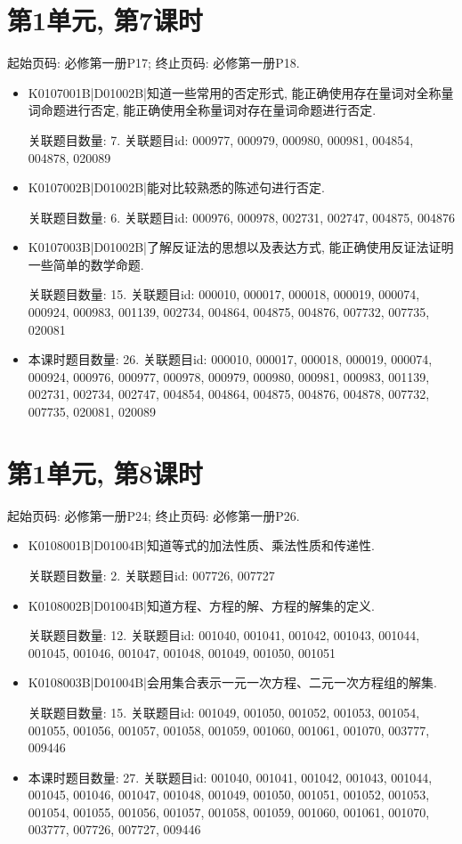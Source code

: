 \section*{第1单元, 第7课时}
起始页码: 必修第一册P17; 终止页码: 必修第一册P18.
\begin{itemize}
\item K0107001B|D01002B|知道一些常用的否定形式, 能正确使用存在量词对全称量词命题进行否定, 能正确使用全称量词对存在量词命题进行否定.

关联题目数量: 7. 关联题目id: 000977, 000979, 000980, 000981, 004854, 004878, 020089

\item K0107002B|D01002B|能对比较熟悉的陈述句进行否定.

关联题目数量: 6. 关联题目id: 000976, 000978, 002731, 002747, 004875, 004876

\item K0107003B|D01002B|了解反证法的思想以及表达方式, 能正确使用反证法证明一些简单的数学命题.

关联题目数量: 15. 关联题目id: 000010, 000017, 000018, 000019, 000074, 000924, 000983, 001139, 002734, 004864, 004875, 004876, 007732, 007735, 020081

\item 本课时题目数量: 26. 关联题目id: 000010, 000017, 000018, 000019, 000074, 000924, 000976, 000977, 000978, 000979, 000980, 000981, 000983, 001139, 002731, 002734, 002747, 004854, 004864, 004875, 004876, 004878, 007732, 007735, 020081, 020089

\end{itemize}

\section*{第1单元, 第8课时}
起始页码: 必修第一册P24; 终止页码: 必修第一册P26.
\begin{itemize}
\item K0108001B|D01004B|知道等式的加法性质、乘法性质和传递性.

关联题目数量: 2. 关联题目id: 007726, 007727

\item K0108002B|D01004B|知道方程、方程的解、方程的解集的定义.

关联题目数量: 12. 关联题目id: 001040, 001041, 001042, 001043, 001044, 001045, 001046, 001047, 001048, 001049, 001050, 001051

\item K0108003B|D01004B|会用集合表示一元一次方程、二元一次方程组的解集.

关联题目数量: 15. 关联题目id: 001049, 001050, 001052, 001053, 001054, 001055, 001056, 001057, 001058, 001059, 001060, 001061, 001070, 003777, 009446

\item 本课时题目数量: 27. 关联题目id: 001040, 001041, 001042, 001043, 001044, 001045, 001046, 001047, 001048, 001049, 001050, 001051, 001052, 001053, 001054, 001055, 001056, 001057, 001058, 001059, 001060, 001061, 001070, 003777, 007726, 007727, 009446

\end{itemize}

